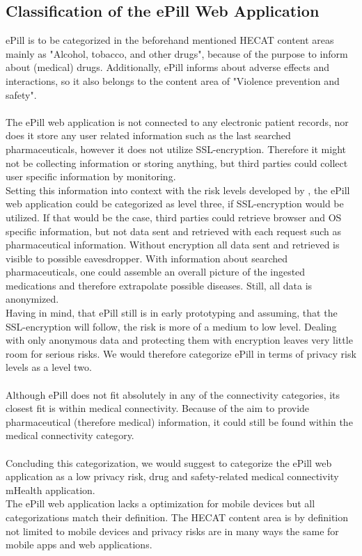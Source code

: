 \subsection{Classification of the ePill Web Application}
ePill is to be categorized in the beforehand mentioned HECAT content areas mainly as "Alcohol, tobacco, and other drugs", because of the purpose to inform about (medical) drugs. Additionally, ePill informs about adverse effects and interactions, so it also belongs to the content area of "Violence prevention and safety".
\\
\\
The ePill web application is not connected to any electronic patient records, nor does it store any user related information such as the last searched pharmaceuticals, however it does not utilize SSL-encryption. Therefore it might not be collecting information or storing anything, but third parties could collect user specific information by monitoring.
\\
Setting this information into context with the risk levels developed by \cite{Njie.2013}, the ePill web application could be categorized as level three, if SSL-encryption would be utilized. If that would be the case, third parties could retrieve browser and OS specific information, but not data sent and retrieved with each request such as pharmaceutical information. Without encryption all data sent and retrieved is visible to possible eavesdropper. With information about searched pharmaceuticals, one could assemble an overall picture of the ingested medications and therefore extrapolate possible diseases. Still, all data is anonymized.
\\
Having in mind, that ePill still is in early prototyping and assuming, that the SSL-encryption will follow, the risk is more of a medium to low level. Dealing with only anonymous data and protecting them with encryption leaves very little room for serious risks. We would therefore categorize ePill in terms of privacy risk levels as a level two.
\\
\\
Although ePill does not fit absolutely in any of the connectivity categories, its closest fit is within medical connectivity. Because of the aim to provide pharmaceutical (therefore medical) information, it could still be found within the medical connectivity category.
\\
\\
Concluding this categorization, we would suggest to categorize the ePill web application as a low privacy risk, drug and safety-related medical connectivity mHealth application.
\\
The ePill web application lacks a optimization for mobile devices but all categorizations match their definition. The HECAT content area is by definition not limited to mobile devices and privacy risks are in many ways the same for mobile apps and web applications.

